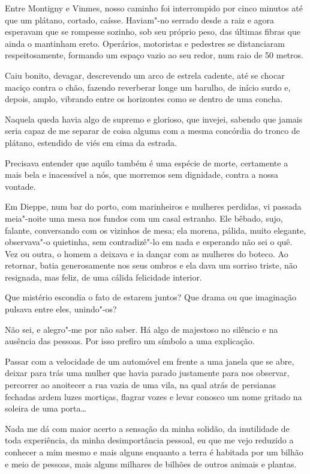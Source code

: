 Entre Montigny e Vinmes, nosso caminho foi interrompido por cinco
minutos até que um plátano, cortado, caísse. Haviam"-no serrado desde a
raiz e agora esperavam que se rompesse sozinho, sob seu próprio peso,
das últimas fibras que ainda o mantinham ereto. Operários, motoristas e
pedestres se distanciaram respeitosamente, formando um espaço vazio ao
seu redor, num raio de 50 metros.

Caiu bonito, devagar, descrevendo um arco de estrela cadente, até se
chocar maciço contra o chão, fazendo reverberar longe um barulho, de
início surdo e, depois, amplo, vibrando entre os horizontes como se
dentro de uma concha.

Naquela queda havia algo de supremo e glorioso, que invejei, sabendo que
jamais seria capaz de me separar de coisa alguma com a mesma
concórdia do tronco de plátano, estendido de viés em cima da estrada.

Precisava entender que aquilo também é uma espécie de morte, certamente
a mais bela e inacessível a nós, que morremos sem dignidade,
contra a nossa vontade.

\asterisc

Em Dieppe, num bar do porto, com marinheiros e mulheres perdidas, vi
passada meia"-noite uma mesa nos fundos com um casal estranho. Ele
bêbado, sujo, falante, conversando com os vizinhos de mesa; ela morena,
pálida, muito elegante, observava"-o quietinha, sem contradizê"-lo em nada
e esperando não sei o quê. Vez ou outra, o homem a deixava e ia dançar
com as mulheres do boteco. Ao retornar, batia generosamente nos seus
ombros e ela dava um sorriso triste, não resignada, mas feliz, de uma
cálida felicidade interior.

Que mistério escondia o fato de estarem juntos? Que drama ou que
imaginação pulsava entre eles, unindo"-os?

Não sei, e alegro"-me por não saber. Há algo de majestoso no silêncio e
na ausência das pessoas. Por isso prefiro um símbolo a uma explicação.

\asterisc

Passar com a velocidade de um automóvel em frente a uma janela que se
abre, deixar para trás uma mulher que havia parado justamente para nos
observar, percorrer ao anoitecer a rua vazia de uma vila, na qual atrás
de persianas fechadas ardem luzes mortiças, flagrar vozes e levar
conosco um nome gritado na soleira de uma porta\ldots{}

Nada me dá com maior acerto a sensação da minha solidão, da inutilidade
de toda experiência, da minha desimportância pessoal, eu que me vejo
reduzido a conhecer a mim mesmo e mais alguns enquanto a terra é
habitada por um bilhão e meio de pessoas, mais alguns milhares de
bilhões de outros animais e plantas.

